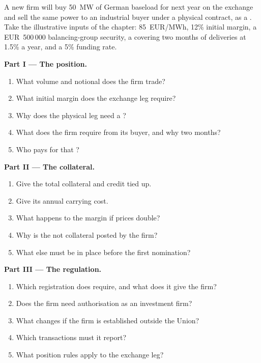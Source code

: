 \begin{problem}\label{pb:m3:getting-access-commodities-and-power:1}
A new firm will buy 50~MW of German baseload for next year on the exchange and sell the same power to an
industrial buyer under a physical contract, as a . Take the illustrative inputs of
the chapter: \qty{85}{EUR/MWh}, 12\% initial margin, a EUR~500\,000 balancing-group security, a 
covering two months of deliveries at 1.5\% a year, and a 5\% funding rate.

\medskip\noindent\textbf{Part I --- The position.}
\begin{enumerate}
\item What volume and notional does the firm trade?
\item What initial margin does the exchange leg require?
\item Why does the physical leg need a ?
\item What  does the firm require from its buyer, and why two months?
\item Who pays for that ?
\end{enumerate}

\medskip\noindent\textbf{Part II --- The collateral.}
\begin{enumerate}[resume]
\item Give the total collateral and credit tied up.
\item Give its annual carrying cost.
\item What happens to the margin if prices double?
\item Why is the  not collateral posted by the firm?
\item What else must be in place before the first nomination?
\end{enumerate}

\medskip\noindent\textbf{Part III --- The regulation.}
\begin{enumerate}[resume]
\item Which registration does  require, and what does it give the firm?
\item Does the firm need authorisation as an investment firm?
\item What changes if the firm is established outside the Union?
\item Which transactions must it report?
\item What position rules apply to the exchange leg?
\end{enumerate}


\end{problem}
